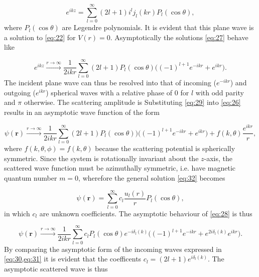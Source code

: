 \documentclass{article}
\numberwithin{equation}{section}
\numberwithin{figure}{section}
\begin{document}
\begin{equation}\label{eq:27}
e^{ikz} = \sum_{l=0}^{\infty} (2l+1)i^l j_l(kr)P_l(\cos\theta),
\end{equation}
where $P_l(\cos\theta)$ are Legendre polynomials. It is evident that this plane wave is a solution to \eqref{eq:22} for $V(r) = 0$. Asymptotically the solutions \eqref{eq:27} behave like

\begin{equation}\label{eq:29}
e^{ikz} \xrightarrow{r \to \infty} \frac{1}{2ikr} \sum_{l=0}^{\infty} (2l+1)P_l(\cos\theta)\big((-1)^{l+1}e^{-ikr} + e^{ikr}\big).
\end{equation}
The incident plane wave can thus be resolved into that of incoming ($e^{-ikr}$) and outgoing ($e^{ikr}$) spherical waves with a relative phase of $0$ for $l$ with odd parity and $\pi$ otherwise. The scattering amplitude is Substituting \eqref{eq:29} into \eqref{eq:26} results in an asymptotic wave function of the form

\begin{equation}\label{eq:30}
\psi(\mathbf{r}) \xrightarrow{r \to \infty} \frac{1}{2ikr}\sum_{l=0}^{\infty} (2l+1)P_l(\cos\theta))\big((-1)^{l+1}e^{-ikr} + e^{ikr}\big) + f(k, \theta) \frac{e^{ikr}}{r},
\end{equation} 
where $f(k,\theta,\phi)=f(k,\theta)$ because the scattering potential is spherically symmetric. Since the system is rotationally invariant about the $z$-axis, the scattered wave function must be azimuthally symmetric, i.e. have magnetic quantum number $m=0$, wherefore the general solution \eqref{eq:32} becomes

\begin{equation}\label{eq:28}
\psi(\mathbf{r}) = \sum_{l=0}^{\infty} c_l \frac{u_l(r)}{r} P_l(\cos\theta),
\end{equation} 
in which $c_l$ are unknown coefficients. The asymptotic behaviour of \eqref{eq:28} is thus

\begin{equation}\label{eq:31}
\psi(\mathbf{r}) \xrightarrow{r \to \infty} \frac{1}{2ikr} \sum_{l=0}^{\infty} c_l P_l(\cos\theta) e^{-i\delta_l(k)} \big((-1)^{l+1}e^{-ikr} + e^{2i\delta_l(k)}e^{ikr}\big).
\end{equation} 
By comparing the asymptotic form of the incoming waves expressed in \cref{eq:30,eq:31} it is evident that the coefficents $c_l = (2l+1)e^{i\delta_l(k)}$. The asymptotic scattered wave is thus
\end{document}
